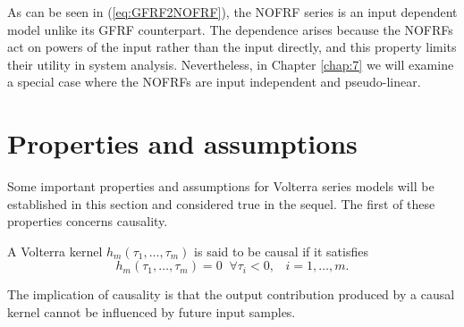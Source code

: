 As can be seen in (\ref{eq:GFRF2NOFRF}), the NOFRF series is an input dependent model unlike its GFRF counterpart. The dependence arises because the NOFRFs act on powers of the input rather than the input directly, and this property limits their utility in system analysis. Nevertheless, in Chapter \ref{chap:7} we will examine a special case where the NOFRFs are input independent and pseudo-linear.

\section{Properties and assumptions}
\label{sec:VolterraProperties}

Some important properties and assumptions for Volterra series models will be established in this section and considered true in the sequel. The first of these properties concerns causality.
\begin{defn}
A Volterra kernel $h_m(\tau_1, \hdots, \tau_m)$ is said to be causal if it satisfies
\begin{equation}
h_m(\tau_1, \hdots, \tau_m) = 0 \; \; \forall \tau_i < 0, \; \; \; i = 1, \hdots, m.
\end{equation}
\end{defn}
The implication of causality is that the output contribution produced by a causal kernel cannot be influenced by future input samples.

